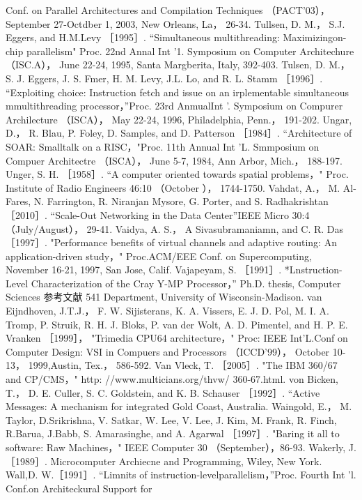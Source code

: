 Conf. on Parallel Architectures and Compilation Techniques （PACT'03）， September 27-Octdber 1, 2003, New Orleans, La，
26-34.
Tullsen, D. M.， S.J. Eggers, and H.M.Levy ［1995］. “Simultaneous multithreading: Maximizingon-chip parallelism" Proc. 22nd
Annal Int '1. Symposium on Computer Architechure （ISC.A）， June 22-24, 1995, Santa Margberita, Italy, 392-403.
Tulsen, D. M.， S. J. Eggers, J. S. Fmer, H. M. Levy, J.L. Lo, and R. L. Stamm ［1996］. “Exploiting choice: Instruction fetch and
issue on an irplementable simultaneous mmultithreading processor，”Proc. 23rd AnmualInt '. Symposium on Compurer
Archilecture （ISCA）， May 22-24, 1996, Philadelphia, Penn.， 191-202.
Ungar, D.， R. Blau, P. Foley, D. Samples, and D. Patterson ［1984］. “Architecture of SOAR: Smalltalk on a RISC，"Proc. 11th
Annual Int 'L. Smmposium on Compuer Architectre （ISCA）， June 5-7, 1984, Ann Arbor, Mich.， 188-197.
Unger, S. H. ［1958］. “A computer oriented towards spatial problems，" Proc. Institute of Radio Engineers 46:10 （October ），
1744-1750.
Vahdat, A.， M. Al-Fares, N. Farrington, R. Niranjan Mysore, G. Porter, and S. Radhakrishtan ［2010］. “Scale-Out Networking in
the Data Center”IEEE Micro 30:4 （July/August）， 29-41.
Vaidya, A. S.， A Sivasubramaniamn, and C. R. Das ［1997］. "Performance benefits of virtual channels and adaptive routing: An
application-driven study，" Proc.ACM/EEE Conf. on Supercomputing, November 16-21, 1997, San Jose, Calif.
Vajapeyam, S. ［1991］. *Lnstruction-Level Characterization of the Cray Y-MP Processor，” Ph.D. thesis, Computer Sciences
参考文献
541
Department, University of Wisconsin-Madison. van Eijndhoven, J.T.J.， F. W. Sijisterans, K. A. Vissers, E. J. D. Pol, M. I. A.
Tromp, P. Struik, R. H. J. Bloks, P. van der Wolt, A. D. Pimentel, and H. P. E. Vranken ［1999］， "Trimedia CPU64
architecture，" Proc: IEEE Int'L.Conf on Computer Design: VSI in Compuers and Processors （ICCD'99）， October 10-13，
1999,Austin, Tex.， 586-592.
Van Vleck, T. ［2005］. "The IBM 360/67 and CP/CMS，" http: //www.multicians.org/thvw/ 360-67.html.
von Bicken, T.， D. E. Culler, S. C. Goldstein, and K. B. Schauser ［1992］. “Active Messages: A mechanism for integrated
Gold Coast, Australia.
Waingold, E.， M. Taylor, D.Srikrishna, V. Satkar, W. Lee, V. Lee, J. Kim, M. Frank, R.
Finch, R.Barua, J.Babb, S. Amarasinghe, and A. Agarwal ［1997］. "Baring it all to software: Raw Machines，" IEEE Computer 30
（September），86-93.
Wakerly, J.［1989］. Microcomputer Archiecne and Programming, Wiley, New York.
Wall,D. W.［1991］. “Limnits of instruction-levelparallelism，”Proc. Fourth Int 'l. Conf.on Architeckural Support for
